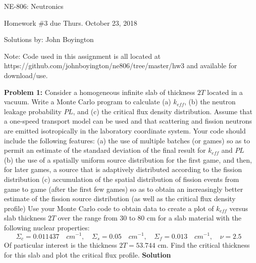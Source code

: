 \documentclass{amsart}
\theoremstyle{definition}
\begin{document}
\LARGE{NE-806: Neutronics}
 
\large
Homework \#3 due Thurs. October 23, 2018
 
Solutions by: John Boyington

Note: Code used in this assignment is all located at https://github.com/johnboyington/ne806/tree/master/hw3 and available for download/use.
\bigskip
 

\textbf{Problem 1:} Consider a homogeneous infinite slab of thickness $2T$ located in a vacuum. Write a
Monte Carlo program to calculate (a) $k_{eff}$, (b) the neutron leakage probability $PL$, and (c) the critical flux density distribution. Assume that a one-speed transport model can be used and that scattering and fission neutrons are emitted isotropically in the laboratory coordinate system.
\bigbreak
Your code should include the following features:
\bigbreak
(a) the use of multiple batches (or games) so as to permit an estimate of the standard deviation of the final result for $k_{eff}$ and $PL$\newline
\bigbreak
(b) the use of a spatially uniform source distribution for the first game, and then, for later games, a source that is adaptively distributed according to the fission distribution\newline
\bigbreak
(c) accumulation of the spatial distribution of fission events from game to game (after the first few games) so as to obtain an increasingly better estimate of the fission source distribution (as well as the critical flux density profile)\newline
\bigbreak
Use your Monte Carlo code to obtain data to create a plot of $k_{eff}$ versus slab thickness $2T$ over the range from 30 to 80 cm for a slab material with the following nuclear properties:
\bigbreak
\begin{equation*}
    \Sigma_c = 0.011437\quad cm^{-1}, \quad \Sigma_s = 0.05\quad cm^{-1}, \quad \Sigma_f = 0.013\quad cm^{-1}, \quad \nu=2.5
\end{equation*}
\bigbreak
Of particular interest is the thickness $2T = 53.744$ cm. Find the critical thickness for this slab and plot the critical flux profile.
\bigbreak
\textbf{Solution}
\end{document}
